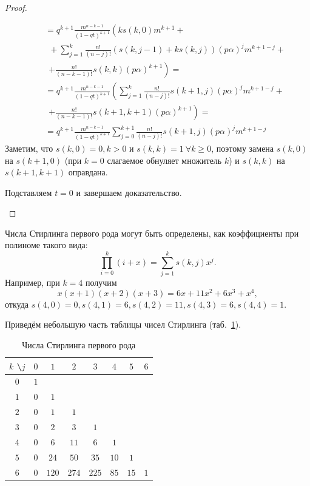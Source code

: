 \documentclass[12pt, specialist, subf, substylefile = spbu_report.rtx]{disser}
\begin{document}
\begin{proof}
\begin{enumerate}
\[\begin{aligned}
					&\quad= q ^{k + 1} \frac {m ^{n - k - 1}} {(1 - qt) ^{k + 1}} \left(k s(k, 0) m ^{k + 1} +\right.\\
					&\quad~~ + \sum \limits ^k _{j = 1} \frac {n !} {(n - j)!} (s(k, j - 1) + k s(k, j)) (p \alpha) ^j m ^{k + 1 - j} +\\
					&\quad~~ \left. +\frac {n !} {(n - k - 1)!} s(k, k) (p \alpha) ^{k + 1}\right)=\\
					&\quad= q ^{k + 1} \frac {m ^{n - k - 1}} {(1 - qt) ^{k + 1}} \left(\sum \limits ^k _{j = 1} \frac {n !} {(n - j)!} s(k + 1, j) (p \alpha) ^j m ^{k + 1 - j} + \right.\\
					&\quad~~ \left. +\frac {n !} {(n - k - 1)!} s(k + 1, k + 1) (p \alpha) ^{k + 1}\right)=\\
					&\quad= q ^{k + 1} \frac {m ^{n - k - 1}} {(1 - qt) ^{k + 1}} \sum \limits ^{k + 1} _{j = 0} \frac {n !} {(n - j)!} s(k + 1, j) (p \alpha) ^j m ^{k + 1 - j}
				\end{aligned}
			\]
			Заметим, что $s(k, 0) = 0, k > 0$ и $s(k, k) = 1~ \forall k \geqslant 0$, поэтому замена $s(k, 0)$ на $s(k + 1, 0)$ (при $k = 0$ слагаемое обнуляет множитель $k$) и $s(k, k)$ на $s(k + 1, k + 1)$ оправдана.
			
			Подставляем $t = 0$ и завершаем доказательство.
		\end{enumerate}
	\end{proof}

	Числа Стирлинга первого рода могут быть определены, как коэффициенты при полиноме такого вида:
	\[
		\prod \limits ^k _{i = 0} (i + x) = \sum \limits ^k _{j = 1} s(k, j) x ^j.
	\]
	Например, при $ k = 4 $ получим
	\[
		x(x + 1)(x + 2)(x + 3) = 6x + 11x ^2 + 6x ^3 + x ^4,
	\]
	откуда $ s(4, 0) = 0, s(4, 1) = 6, s(4, 2) = 11, s(4, 3) = 6, s(4, 4) = 1 $. 
	
	Приведём небольшую часть таблицы чисел Стирлинга (таб.~\ref{tab:stirling1}).
	\begin{table}[!h]
		\centering
		\caption{Числа Стирлинга первого рода}
		\begin{tabular}{c|ccccccc}
			$k$ \textbackslash $j$ & $0$ & $1$ & $2$ & $3$ & $4$ & $5$ & $6$\\ \hline
			$0$ & $1$ &  &  &  &  &  & \\
			$1$ & $0$ & $1$ &  &  &  &  & \\
			$2$ & $0$ & $1$ & $1$ &  &  &  & \\
			$3$ & $0$ & $2$ & $3$ & $1$ &  &  & \\
			$4$ & $0$ & $6$ & $11$ & $6$ & $1$ &  & \\
			$5$ & $0$ & $24$ & $50$ & $35$ & $10$ & $1$ & \\
			$6$ & $0$ & $120$ & $274$ & $225$ & $85$ & $15$ & $1$\\
		\end{tabular}
		\label{tab:stirling1}
	\end{table}
	
\end{document}
